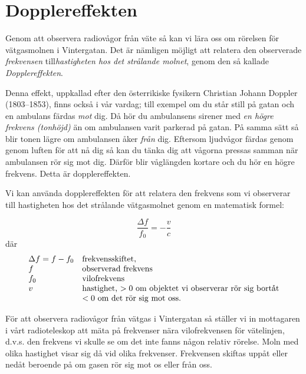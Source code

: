 \section{Dopplereffekten}
Genom att observera radiovågor från väte så kan vi lära oss om rörelsen
för vätgasmolnen i Vintergatan. Det är nämligen möjligt att relatera den
observerade {\em frekvensen} till{\em hastigheten hos det strålande molnet}, 
genom den så kallade {\em Dopplereffekten}.

Denna effekt, uppkallad efter den österrikiske fysikern Christian Johann Doppler
(1803--1853), finns också i vår vardag; till exempel om du står still på gatan 
och en ambulans färdas {\em mot } dig. Då hör du ambulansens sirener med {\em en högre
frekvens (tonhöjd)} än om ambulansen varit parkerad på gatan. På samma sätt
så blir tonen lägre om ambulansen åker {\em från } dig. Eftersom
ljudvågor färdas genom genom luften för att nå dig så kan du tänka dig att
vågorna pressas samman när ambulansen rör sig mot dig. Därför blir våglängden
kortare och du hör en högre frekvens. Detta är dopplereffekten. 

Vi kan använda dopplereffekten för att relatera den frekvens som vi observerar till
hastigheten hos det strålande vätgasmolnet genom en matematisk formel:

\begin{equation}
{\boxed{
\frac{\Delta f}{f_0}=-\frac{v}{c}
}}
\end{equation}
där
\begin{displaymath}
\begin{array}{ll}
  \Delta f=f-f_0    &\hbox{frekvensskiftet}, 	\\
  f		    &\hbox{observerad frekvens} 	\\
  f_0		    &\hbox{vilofrekvens}	\\
  v		    &\hbox{hastighet, $> 0$ om objektet vi observerar
    rör sig bortåt}	\\
                    &\hbox{$< 0$ om det rör sig mot oss.}
\end{array}
\end{displaymath}

För att observera radiovågor från vätgas i Vintergatan så ställer vi in 
mottagaren i vårt radioteleskop att mäta på frekvenser nära vilofrekvensen 
för vätelinjen, d.v.s. den frekvens vi skulle se om det inte fanns någon relativ
rörelse. Moln med olika hastighet visar sig då vid olika frekvenser. Frekvensen
skiftas uppåt eller nedåt beroende på om gasen rör sig mot os eller från oss. 

